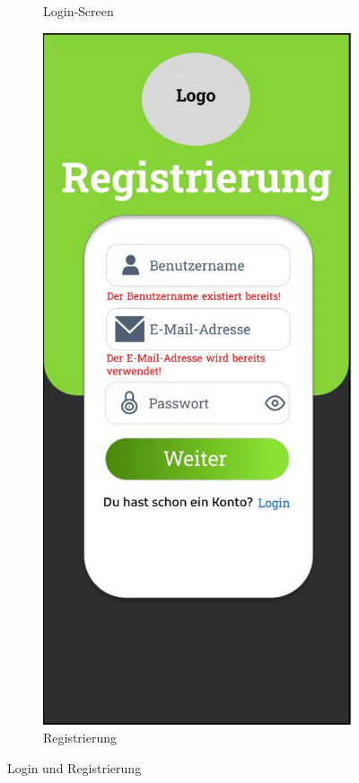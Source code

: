 \begin{figure}[htbp]
\begin{subfigure}[b]{0.45\linewidth}
    \caption{Login-Screen}
    \label{fig:login-screen}
  \end{subfigure}
  \hfill
  \begin{subfigure}[b]{0.45\linewidth}
    \centering
    \includegraphics[width=\linewidth]{images/Mockups/Registrierung.JPG}
    \caption{Registrierung}
    \label{fig:registrierung}
  \end{subfigure}
  \caption{Login und Registrierung}
\end{figure}

